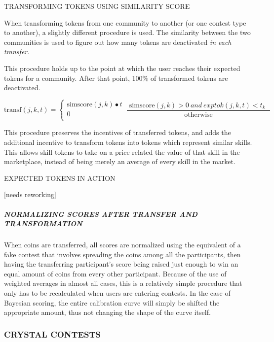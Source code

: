 TRANSFORMING TOKENS USING SIMILARITY SCORE

When transforming tokens from one community to another (or one contest
type to another), a slightly different procedure is used. The similarity
between the two communities is used to figure out how many tokens are
deactivated \emph{in each transfer}.

This procedure holds up to the point at which the user reaches their
expected tokens for a community. After that point, 100\% of transformed
tokens are deactivated.

\[\text{transf}\left( j,k,t \right) = \left\{ \begin{matrix}
\text{simscore}\left( j,k \right) \bullet t \\
0 \\
\end{matrix} \right.\ \frac{\text{\ \ \ \ simscore}\left( j,k \right) > 0\ and\ exptok\left( j,k,t \right) < t_{k}\text{\ \ }}{\text{otherwise}}\ \]

This procedure preserves the incentives of transferred tokens, and adds
the additional incentive to transform tokens into tokens which represent
similar skills. This allows skill tokens to take on a price related the
value of that skill in the marketplace, instead of being merely an
average of every skill in the market.

EXPECTED TOKENS IN ACTION

{[}needs reworking{]}

\subparagraph{NORMALIZING SCORES AFTER TRANSFER AND
TRANSFORMATION}\label{normalizing-scores-after-transfer-and-transformation}

When coins are transferred, all scores are normalized using the
equivalent of a fake contest that involves spreading the coins among all
the participants, then having the transferring participant's score being
raised just enough to win an equal amount of coins from every other
participant. Because of the use of weighted averages in almost all
cases, this is a relatively simple procedure that only has to be
recalculated when users are entering contests. In the case of Bayesian
scoring, the entire calibration curve will simply be shifted the
appropriate amount, thus not changing the shape of the curve itself.

\subsubsection{\texorpdfstring{\protect\hypertarget{_ifdcb2xo8ouo}{}{\protect\hypertarget{_Toc462050414}{}{}}CRYSTAL
CONTESTS}{CRYSTAL CONTESTS}}\label{crystal-contests}

